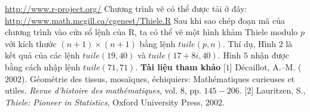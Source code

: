 \begin{multicols}{2}
{	\url{http://www.r-project.org/}
	\vskip 0.1cm
	Chương trình vẽ có thể được tải ở đây:
	\url{http://www.math.mcgill.ca/cgenest/Thiele.R}
	\vskip 0.1cm
	Sau khi sao chép đoạn mã của chương trình vào cửa sổ lệnh của R, ta có thể vẽ một hình khảm Thiele modulo $p$ với kích thước $(n + 1) \times (n + 1)$ bằng lệnh $tuile(p, n)$. Thí dụ, Hình $2$ là kết quả của các lệnh $tuile(19,40)$ và $tuile(17 + 8i, 40)$. Hình $5$ nhận được bằng cách nhập lệnh $tuile(71, 71)$.}
	\vskip 0.1cm
	\textbf{\color{toanhocdoisong}Tài liệu tham khảo}
	\vskip 0.1cm
	[$1$] Décaillot, A.--M. ($2002$). Géométrie des tissus, mosaïques, échiquiers: Mathématiques curieuses et utiles. \textit{Revue d'histoire des mathématiques}, vol. $8$, pp. $145-206$.
	\vskip 0.1cm
	[$2$] Lauritzen, S., \textit{Thiele: Pioneer in Statistics}, Oxford University Press, $2002$.
\end{multicols}